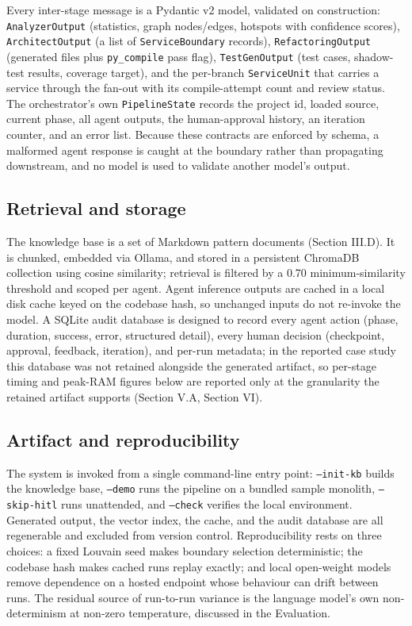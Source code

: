 \documentclass[conference]{IEEEtran}
\begin{document}
Every inter-stage message is a Pydantic v2 model, validated on construction: \texttt{AnalyzerOutput} (statistics, graph nodes/edges, hotspots with confidence scores), \texttt{ArchitectOutput} (a list of \texttt{ServiceBoundary} records), \texttt{RefactoringOutput} (generated files plus \texttt{py\_compile} pass flag), \texttt{TestGenOutput} (test cases, shadow-test results, coverage target), and the per-branch \texttt{ServiceUnit} that carries a service through the fan-out with its compile-attempt count and review status. The orchestrator's own \texttt{PipelineState} records the project id, loaded source, current phase, all agent outputs, the human-approval history, an iteration counter, and an error list. Because these contracts are enforced by schema, a malformed agent response is caught at the boundary rather than propagating downstream, and no model is used to validate another model's output.

\subsection{Retrieval and storage}

The knowledge base is a set of Markdown pattern documents (Section III.D). It is chunked, embedded via Ollama, and stored in a persistent ChromaDB collection using cosine similarity; retrieval is filtered by a 0.70 minimum-similarity threshold and scoped per agent. Agent inference outputs are cached in a local disk cache keyed on the codebase hash, so unchanged inputs do not re-invoke the model. A SQLite audit database is designed to record every agent action (phase, duration, success, error, structured detail), every human decision (checkpoint, approval, feedback, iteration), and per-run metadata; in the reported case study this database was not retained alongside the generated artifact, so per-stage timing and peak-RAM figures below are reported only at the granularity the retained artifact supports (Section V.A, Section VI).

\subsection{Artifact and reproducibility}

The system is invoked from a single command-line entry point: \texttt{--init-kb} builds the knowledge base, \texttt{--demo} runs the pipeline on a bundled sample monolith, \texttt{--skip-hitl} runs unattended, and \texttt{--check} verifies the local environment. Generated output, the vector index, the cache, and the audit database are all regenerable and excluded from version control. Reproducibility rests on three choices: a fixed Louvain seed makes boundary selection deterministic; the codebase hash makes cached runs replay exactly; and local open-weight models remove dependence on a hosted endpoint whose behaviour can drift between runs. The residual source of run-to-run variance is the language model's own non-determinism at non-zero temperature, discussed in the Evaluation.
\end{document}
